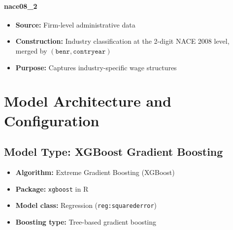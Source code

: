\documentclass{article}
\begin{document}
\paragraph{nace08\_2}
\begin{itemize}
    \item \textbf{Source:} Firm-level administrative data
    \item \textbf{Construction:} Industry classification at the 2-digit NACE 2008 level, merged by $(\texttt{benr}, \texttt{contryear})$
    \item \textbf{Purpose:} Captures industry-specific wage structures
\end{itemize}









\section{Model Architecture and Configuration}

\subsection{Model Type: XGBoost Gradient Boosting}

\begin{itemize}
    \item \textbf{Algorithm:} Extreme Gradient Boosting (XGBoost)
    \item \textbf{Package:} \texttt{xgboost} in R
    \item \textbf{Model class:} Regression (\texttt{reg:squarederror})
    \item \textbf{Boosting type:} Tree-based gradient boosting
\end{itemize}
\end{document}
